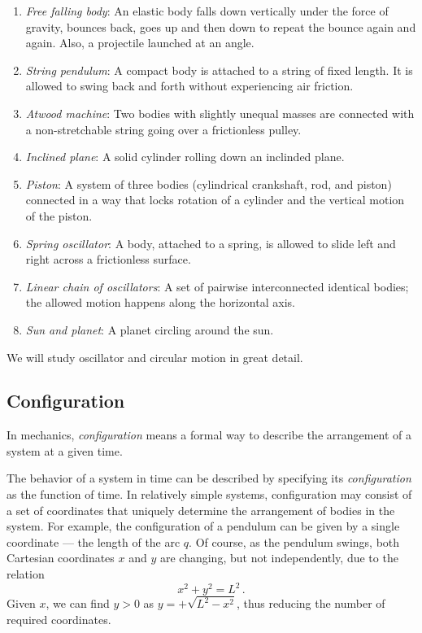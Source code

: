 \begin{enumerate}
	\item \emph{Free falling body}: An elastic body falls down vertically under the
	force of gravity, bounces back, goes up and then down to repeat the
	bounce again and again. Also, a projectile launched at an angle.
	\item \emph{String pendulum}: A compact body is attached to a string
	of fixed length. It is allowed to swing back and forth without
	experiencing air friction.
	\item \emph{Atwood machine}: Two bodies with slightly unequal masses
	are connected with a non-stretchable string going over a
	frictionless pulley.
	\item \emph{Inclined plane}: A solid cylinder rolling down an
	inclinded plane.
	\item \emph{Piston}: A system of three bodies (cylindrical
	crankshaft, rod, and piston) connected in a way that locks rotation
	of a cylinder and the vertical motion of the piston.
	\item \emph{Spring oscillator}: A body, attached to a spring, is
	allowed to slide left and right across a frictionless surface.
	\item \emph{Linear chain of oscillators}: A set of pairwise
	interconnected identical bodies; the allowed motion happens along
	the horizontal axis.
	\item \emph{Sun and planet}: A planet circling around the sun.
	
\end{enumerate}
We will study oscillator and circular motion in great detail.

\subsection{Configuration}
In mechanics, \emph{configuration} means a formal way to describe the
arrangement of a system at a given time.

The behavior of a system in time can be described by specifying its
\emph{configuration} as the function of time. In relatively simple
systems, configuration may consist of a set of coordinates that uniquely
determine the arrangement of bodies in the system. For example, the
configuration of a pendulum can be given by a single coordinate --- the
length of the arc $q$. Of course, as the pendulum swings, both
Cartesian coordinates $x$ and $y$ are changing, but not independently,
due to the relation
\begin{equation*}
	x^2 + y^2 = L^2\, .
\end{equation*}
Given $x$, we can find $y > 0$ as $y = +\sqrt{L^2 - x^2}$, thus
reducing the number of required coordinates.

